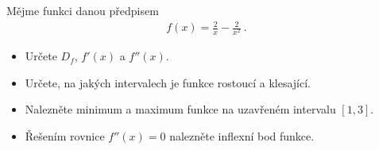 Mějme funkci danou předpisem
\begin{align*}
    f(x)= \frac{ 2 }{x} - \frac{ 2 }{ x^2 } \:.
\end{align*}
\begin{itemize}
    \item Určete $D_f$, $f'(x)$ a $f''(x)$.
    \item Určete, na jakých intervalech je funkce rostoucí a klesající.
    \item Nalezněte minimum a maximum funkce na uzavřeném intervalu $[1,3]$.
    \item Řešením rovnice $f''(x)=0$ nalezněte inflexní bod funkce.
\end{itemize}
    
